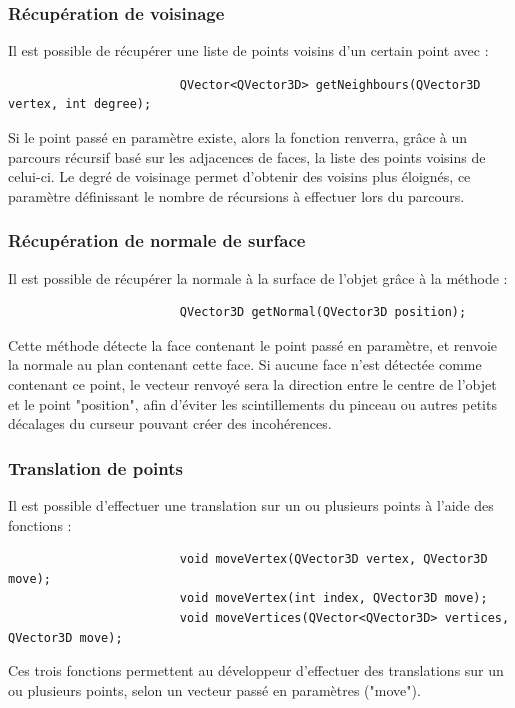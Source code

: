 \documentclass[a4paper]{memoir}
\begin{document}
				\subsubsection{Récupération de voisinage}
					Il est possible de récupérer une liste de points voisins d'un certain point avec :
					\begin{verbatim}
						QVector<QVector3D> getNeighbours(QVector3D vertex, int degree);
					\end{verbatim}
					Si le point passé en paramètre existe, alors la fonction renverra, grâce à un parcours récursif basé sur les adjacences de faces, la 
					liste des points voisins de celui-ci. Le degré de voisinage permet d'obtenir des voisins plus éloignés, ce paramètre définissant le 
					nombre de récursions à effectuer lors du parcours.
					
				\subsubsection{Récupération de normale de surface}
					Il est possible de récupérer la normale à la surface de l'objet grâce à la méthode :
					\begin{verbatim}
						QVector3D getNormal(QVector3D position);
					\end{verbatim}
					Cette méthode détecte la face contenant le point passé en paramètre, et renvoie la normale au plan contenant cette face. Si aucune face 
					n'est détectée comme contenant ce point, le vecteur renvoyé sera la direction entre le centre de l'objet et le point "position", afin 
					d'éviter les scintillements du pinceau ou autres petits décalages du curseur pouvant créer des incohérences.
					
				\subsubsection{Translation de points}
					Il est possible d'effectuer une translation sur un ou plusieurs points à l'aide des fonctions :
					\begin{verbatim}
						void moveVertex(QVector3D vertex, QVector3D move);
						void moveVertex(int index, QVector3D move);
						void moveVertices(QVector<QVector3D> vertices, QVector3D move);
					\end{verbatim}
					Ces trois fonctions permettent au développeur d'effectuer des translations sur un ou plusieurs points, selon un vecteur passé en 
					paramètres ("move").
					
\end{document}
